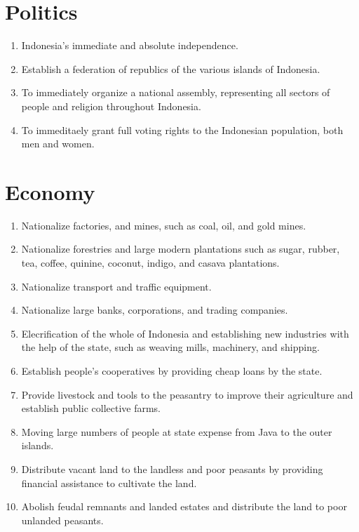 \section{Politics}

\begin{enumerate}
    \item Indonesia's immediate and absolute independence.
    \item Establish a federation of republics of the various islands of Indonesia.
    \item To immediately organize a national assembly, representing all sectors of people and religion throughout Indonesia.
    \item To immeditaely grant full voting rights to the Indonesian population, both men and women.
\end{enumerate}

\section{Economy}

\begin{enumerate}
    \item Nationalize factories, and mines, such as coal, oil, and gold mines.
    \item Nationalize forestries and large modern plantations such as sugar, rubber, tea, coffee, quinine, coconut, indigo, and casava plantations.
    \item Nationalize transport and traffic equipment.
    \item Nationalize large banks, corporations, and trading companies.
    \item Elecrification of the whole of Indonesia and establishing new industries with the help of the state, such as weaving mills, machinery, and shipping.
    \item Establish people's cooperatives by providing cheap loans by the state.
    \item Provide livestock and tools to the peasantry to improve their agriculture and establish public collective farms.
    \item Moving large numbers of people at state expense from Java to the outer islands.
    \item Distribute vacant land to the landless and poor peasants by providing financial assistance to cultivate the land.
    \item Abolish feudal remnants and landed estates and distribute the land to poor unlanded peasants.
\end{enumerate}

